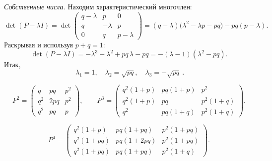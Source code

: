 \emph{Собственные числа.} Находим характеристический многочлен:
\[
	\det(P-\lambda I)=
	\det\begin{pmatrix}
		q-\lambda & p        & 0         \\
		q         & -\lambda & p         \\
		0         & q        & p-\lambda
	\end{pmatrix}
	=(q-\lambda)\bigl(\lambda^2-\lambda p-pq\bigr)-pq(p-\lambda).
\]
Раскрывая и используя $p+q=1$:
\[
	\det(P-\lambda I)
	= -\lambda^3+\lambda^2+pq\,\lambda-pq
	= -(\lambda-1)(\lambda^2-pq).
\]
Итак,
\[
	\boxed{\ \lambda_1=1,\quad \lambda_2=\sqrt{pq},\quad \lambda_3=-\sqrt{pq}\ }.
\]

\[
	P^2 =
	\begin{pmatrix}
		q   & pq  & p^2 \\
		q^2 & 2pq & p^2 \\
		q^2 & pq  & p
	\end{pmatrix},
	\qquad
	P^3 =
	\begin{pmatrix}
		q^2(1+p) & pq(1+p) & p^2      \\
		q^2(1+p) & pq      & p^2(1+q) \\
		q^2      & pq(1+q) & p^2(1+q)
	\end{pmatrix}.
\]

\[
	P^4 =
	\begin{pmatrix}
		q^2(1+p)  & pq(1+pq)  & p^2(1+pq) \\
		q^2(1+pq) & pq(1+2pq) & p^2(1+pq) \\
		q^2(1+pq) & pq(1+pq)  & p^2(1+q)
	\end{pmatrix}.
\]